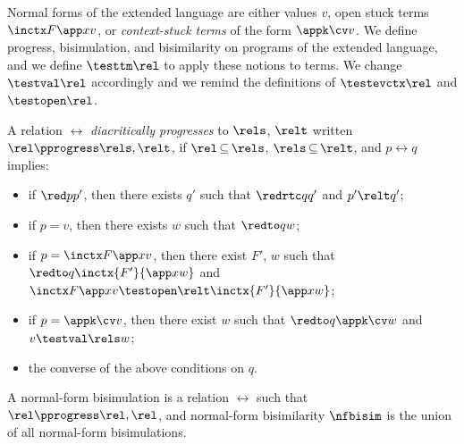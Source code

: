 \documentclass{lmcs}
\theoremstyle{defC}
\begin{document}
Normal forms of the extended language are either values $v$, open
stuck terms $\inctx F {\app x v}$, or \emph{context-stuck terms} of
the form $\appk \cv v$. We define progress, bisimulation, and
bisimilarity on programs of the extended language, and we define
$\testtm \rel$ to apply these notions to terms. We change $\testval
\rel$ accordingly and we remind the definitions of $\testevctx \rel$
and $\testopen \rel$.


\vspace{2mm}
\begin{defi}%
  \label{def:progress-ab}
  A relation $\rel$ \textit{diacritically progresses} to $\rels$, $\relt$
  written $\rel \pprogress \rels, \relt$, if $\rel \mathop\subseteq
  \rels$, $\rels \mathop\subseteq \relt$, and $p \rel q$ implies:
  \begin{itemize}
  \item if $\red p {p'}$, then there exists $q'$ such that $\redrtc q {q'}$ and $p'
    \relt q'$;
  \item if $p=v$, then there exists $w$ such that $\redto q w$;
  \item if $p=\inctx F {\app x v}$, then there exist $F'$, $w$ such that
    $\redto q {\inctx {F'}{\app x w}}$ and $\inctx F {\app x v}
    \testopen\relt \inctx {F'}{\app x w}$;
  \item if $p=\appk \cv v$, then there exist $w$ such that
    $\redto q \appk \cv w$ and $v \testval\rels w$;
  \item the converse of the above conditions on $q$.
  \end{itemize}
  A normal-form bisimulation is a relation $\rel$ such that
  $\rel \pprogress \rel, \rel$, and normal-form bisimilarity $\nfbisim$ is the
  union of all normal-form bisimulations.
\end{defi}
\end{document}
